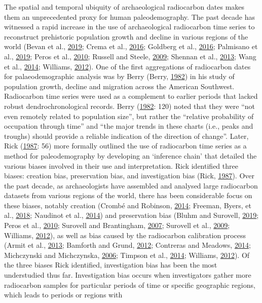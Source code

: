 \documentclass[
]{article}
\begin{document}
The spatial and temporal ubiquity of archaeological radiocarbon dates makes them an unprecedented proxy for human paleodemography. The past decade has witnessed a rapid increase in the use of archaeological radiocarbon time series to reconstruct prehistoric population growth and decline in various regions of the world (Bevan et al., \protect\hyperlink{ref-Bevan2019}{2019}; Crema et al., \protect\hyperlink{ref-Crema2016}{2016}; Goldberg et al., \protect\hyperlink{ref-Goldberg2016}{2016}; Palmisano et al., \protect\hyperlink{ref-Palmisano2019}{2019}; Peros et al., \protect\hyperlink{ref-Peros2010}{2010}; Russell and Steele, \protect\hyperlink{ref-Russell2009}{2009}; Shennan et al., \protect\hyperlink{ref-Shennan2013}{2013}; Wang et al., \protect\hyperlink{ref-Wang2014}{2014}; Williams, \protect\hyperlink{ref-Williams2012}{2012}). One of the first aggregations of radiocarbon dates for palaeodemographic analysis was by Berry (Berry, \protect\hyperlink{ref-Berry1982}{1982}) in his study of population growth, decline and migration across the American Southwest. Radiocarbon time series were used as a complement to earlier periods that lacked robust dendrochronological records. Berry (\protect\hyperlink{ref-Berry1982}{1982}: 120) noted that they were ``not even remotely related to population size'', but rather the ``relative probability of occupation through time'' and ``the major trends in these charts (i.e., peaks and troughs) should provide a reliable indication of the direction of change''. Later, Rick (\protect\hyperlink{ref-Rick1987}{1987}: 56) more formally outlined the use of radiocarbon time series as a method for paleodemography by developing an `inference chain' that detailed the various biases involved in their use and interpretation. Rick identified three biases: creation bias, preservation bias, and investigation bias (Rick, \protect\hyperlink{ref-Rick1987}{1987}). Over the past decade, as archaeologists have assembled and analysed large radiocarbon datasets from various regions of the world, there has been considerable focus on these biases, notably creation (Crombé and Robinson, \protect\hyperlink{ref-Crombe2014}{2014}; Freeman, Byers, et al., \protect\hyperlink{ref-Freeman2018}{2018}; Naudinot et al., \protect\hyperlink{ref-Naudinot2014}{2014}) and preservation bias (Bluhm and Surovell, \protect\hyperlink{ref-Bluhm2019}{2019}; Peros et al., \protect\hyperlink{ref-Peros2010}{2010}; Surovell and Brantingham, \protect\hyperlink{ref-Surovell2007}{2007}; Surovell et al., \protect\hyperlink{ref-Surovell2009}{2009}; Williams, \protect\hyperlink{ref-Williams2012}{2012}), as well as bias caused by the radiocarbon calibration process (Armit et al., \protect\hyperlink{ref-Armit2013}{2013}; Bamforth and Grund, \protect\hyperlink{ref-Bamforth2012}{2012}; Contreras and Meadows, \protect\hyperlink{ref-Contreras2014}{2014}; Michczynski and Michczynska, \protect\hyperlink{ref-Michczynski2006}{2006}; Timpson et al., \protect\hyperlink{ref-Timpson2014}{2014}; Williams, \protect\hyperlink{ref-Williams2012}{2012}). Of the three biases Rick identified, investigation bias has been the most understudied thus far. Investigation bias occurs when investigators gather more radiocarbon samples for particular periods of time or specific geographic regions, which leads to periods or regions with 
\end{document}

